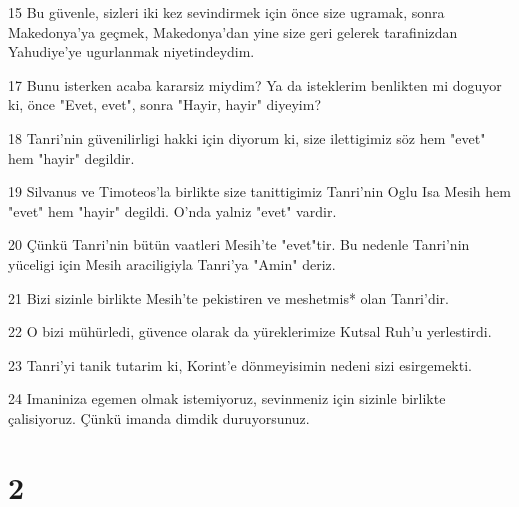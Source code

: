 \par 15 Bu güvenle, sizleri iki kez sevindirmek için önce size ugramak, sonra Makedonya'ya geçmek, Makedonya'dan yine size geri gelerek tarafinizdan Yahudiye'ye ugurlanmak niyetindeydim.
\par 17 Bunu isterken acaba kararsiz miydim? Ya da isteklerim benlikten mi doguyor ki, önce "Evet, evet", sonra "Hayir, hayir" diyeyim?
\par 18 Tanri'nin güvenilirligi hakki için diyorum ki, size ilettigimiz söz hem "evet" hem "hayir" degildir.
\par 19 Silvanus ve Timoteos'la birlikte size tanittigimiz Tanri'nin Oglu Isa Mesih hem "evet" hem "hayir" degildi. O'nda yalniz "evet" vardir.
\par 20 Çünkü Tanri'nin bütün vaatleri Mesih'te "evet"tir. Bu nedenle Tanri'nin yüceligi için Mesih araciligiyla Tanri'ya "Amin" deriz.
\par 21 Bizi sizinle birlikte Mesih'te pekistiren ve meshetmis* olan Tanri'dir.
\par 22 O bizi mühürledi, güvence olarak da yüreklerimize Kutsal Ruh'u yerlestirdi.
\par 23 Tanri'yi tanik tutarim ki, Korint'e dönmeyisimin nedeni sizi esirgemekti.
\par 24 Imaniniza egemen olmak istemiyoruz, sevinmeniz için sizinle birlikte çalisiyoruz. Çünkü imanda dimdik duruyorsunuz.

\chapter{2}

